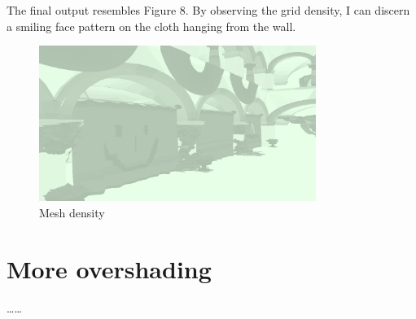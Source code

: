 \documentclass[10pt]{article}
\begin{document}
\noindent The final output resembles Figure 8. By observing the grid density, I can discern a smiling face pattern on the cloth hanging from the wall.

\begin{figure}[htbp]
    \centering
    \includegraphics[width=9cm]{1.6_meshdensity_smile.png}
    \caption{Mesh density}
\end{figure}

\section{More overshading}

\noindent \dots\dots
\end{document}
